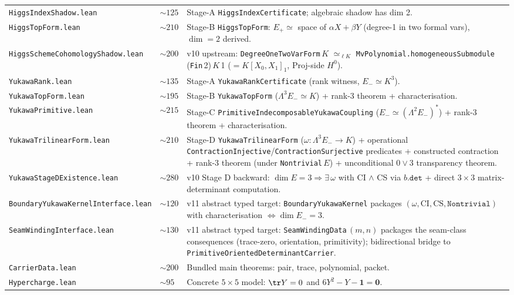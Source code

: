 \begin{center}
\begin{tabularx}{0.98\textwidth}{@{}p{}p{}Y@{}}
\texttt{HiggsIndexShadow.lean}    & $\sim125$ & Stage-A \texttt{HiggsIndexCertificate}; algebraic shadow has dim 2. \\
\texttt{HiggsTopForm.lean}        & $\sim210$ & Stage-B \texttt{HiggsTopForm}: $E_+ \simeq$ space of $\alpha X + \beta Y$ (degree-1 in two formal vars), $\dim = 2$ derived. \\
\texttt{HiggsSchemeCohomologyShadow.lean} & $\sim200$ & v10 upstream: \texttt{DegreeOneTwoVarForm}\,$K$ $\simeq_{\ell K}$ \texttt{MvPolynomial.homogeneousSubmodule}\,(\texttt{Fin}\,2)\,$K$\,1 ($= K[X_0, X_1]_1$, Proj-side $H^0$). \\
\texttt{YukawaRank.lean}          & $\sim135$ & Stage-A \texttt{YukawaRankCertificate} (rank witness, $E_- \simeq K^3$). \\
\texttt{YukawaTopForm.lean}       & $\sim195$ & Stage-B \texttt{YukawaTopForm} ($\Lambda^3 E_- \simeq K$) + rank-3 theorem + characterisation. \\
\texttt{YukawaPrimitive.lean}     & $\sim215$ & Stage-C \texttt{PrimitiveIndecomposableYukawaCoupling} ($E_- \simeq (\Lambda^2 E_-)^*$) + rank-3 theorem + characterisation. \\
\texttt{YukawaTrilinearForm.lean} & $\sim210$ & Stage-D \texttt{YukawaTrilinearForm} ($\omega : \Lambda^3 E_- \to K$) + operational \texttt{ContractionInjective}/\texttt{ContractionSurjective} predicates + constructed contraction + rank-3 theorem (under \texttt{Nontrivial}\,$E$) + unconditional $0\lor3$ transparency theorem. \\
\texttt{YukawaStageDExistence.lean}& $\sim280$ & v10 Stage D backward: $\dim E = 3 \Rightarrow \exists\,\omega$ with CI $\wedge$ CS via $b.\texttt{det}$ + direct $3\times 3$ matrix-determinant computation. \\
\texttt{BoundaryYukawaKernelInterface.lean}& $\sim120$ & v11 abstract typed target: \texttt{BoundaryYukawaKernel} packages $(\omega, \textrm{CI}, \textrm{CS}, \texttt{Nontrivial})$ with characterisation $\iff \dim E_- = 3$. \\
\texttt{SeamWindingInterface.lean}& $\sim130$ & v11 abstract typed target: \texttt{SeamWindingData}\,$(m, n)$ packages the seam-class consequences (trace-zero, orientation, primitivity); bidirectional bridge to \texttt{PrimitiveOrientedDeterminantCarrier}. \\
\texttt{CarrierData.lean}         & $\sim200$ & Bundled main theorems: pair, trace, polynomial, packet. \\
\texttt{Hypercharge.lean}         & $\sim95$  & Concrete $5\times5$ model: $\tr Y=0$ and $6Y^2-Y-\mathbf 1 = \mathbf 0$. \\

\end{tabularx}
\end{center}

